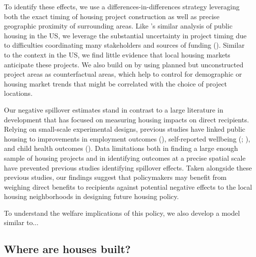 \documentclass[12pt]{article}
\begin{document}
To identify these effects, we use a differences-in-differences strategy leveraging both the exact timing of housing project construction as well as precise geographic proximity of surrounding areas.  Like \cite{diamond2016wants}'s similar analysis of public housing in the US, we leverage the substantial uncertainty in project timing due to difficulties coordinating many stakeholders and sources of funding (\cite{serihistory}).  Similar to the context in the US, we find little evidence that local housing markets anticipate these projects.  We also build on \cite{diamond2016wants} by using planned but unconstructed project areas as counterfactual areas, which help to control for demographic or housing market trends that might be correlated with the choice of project locations.

Our negative spillover estimates stand in contrast to a large literature in development that has focused on measuring housing impacts on direct recipients.  Relying on small-scale experimental designs, previous studies have linked public housing to improvements in employment outcomes (\cite{franklin2016enabled}), self-reported wellbeing (\cite{galiani2017shelter}; \cite{devoto2012happiness}), and child health outcomes (\cite{cattaneo2009housing}).  Data limitations both in finding a large enough sample of housing projects and in identifying outcomes at a precise spatial scale have prevented previous studies identifying spillover effects.  Taken alongside these previous studies, our findings suggest that policymakers may benefit from weighing direct benefits to recipients against potential negative effects to the local housing neighborhoods in designing future housing policy.

To understand the welfare implications of this policy, we also develop a model similar to... 



\subsection{Where are houses built?}
\end{document}

